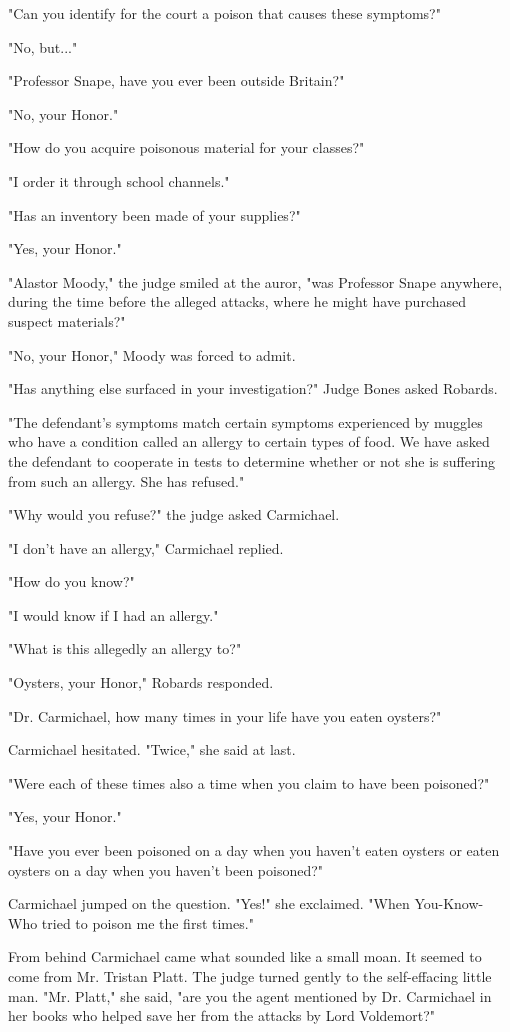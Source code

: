 \documentclass[a4paper,11pt]{article}
\begin{document}
"Can you identify for the court a poison that causes these symptoms?"

"No, but..."

"Professor Snape, have you ever been outside Britain?"

"No, your Honor."

"How do you acquire poisonous material for your classes?"

"I order it through school channels."

"Has an inventory been made of your supplies?"

"Yes, your Honor."

"Alastor Moody," the judge smiled at the auror, "was Professor Snape anywhere, during the time before the alleged attacks, where he might have purchased suspect materials?"

"No, your Honor," Moody was forced to admit.

"Has anything else surfaced in your investigation?" Judge Bones asked Robards.

"The defendant's symptoms match certain symptoms experienced by muggles who have a condition called an allergy to certain types of food. We have asked the defendant to cooperate in tests to determine whether or not she is suffering from such an allergy. She has refused."

"Why would you refuse?" the judge asked Carmichael.

"I don't have an allergy," Carmichael replied.

"How do you know?"

"I would know if I had an allergy."

"What is this allegedly an allergy to?"

"Oysters, your Honor," Robards responded.

"Dr. Carmichael, how many times in your life have you eaten oysters?"

Carmichael hesitated. "Twice," she said at last.

"Were each of these times also a time when you claim to have been poisoned?"

"Yes, your Honor."

"Have you ever been poisoned on a day when you haven't eaten oysters or eaten oysters on a day when you haven't been poisoned?"

Carmichael jumped on the question. "Yes!" she exclaimed. "When You-Know-Who tried to poison me the first times."

From behind Carmichael came what sounded like a small moan. It seemed to come from Mr. Tristan Platt. The judge turned gently to the self-effacing little man. "Mr. Platt," she said, "are you the agent mentioned by Dr. Carmichael in her books who helped save her from the attacks by Lord Voldemort?"
\end{document}
